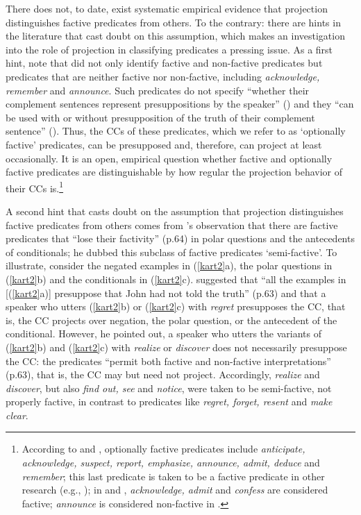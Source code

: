 \documentclass[11pt,fleqn]{article}
\newcommand{\6}{\mbox{$[\hspace*{-.6mm}[$}}
\newcommand{\9}{\mbox{$]\hspace*{-.6mm}]$}}
\newcommand{\citepos}[1]{\citeauthor{#1}'s \citeyear{#1}}
\begin{document}
There does not, to date, exist systematic empirical evidence that projection distinguishes factive predicates from others. To the contrary: there are hints in the literature that cast doubt on this assumption, which makes an investigation into the role of projection in classifying predicates a pressing issue. As a first hint, note that \citealt{kiparsky-kiparsky70} did not only identify factive and non-factive predicates but predicates that are neither factive nor non-factive, including {\em acknowledge, remember} and {\em announce}. Such predicates do not specify ``whether their complement sentences represent presuppositions by the speaker'' (\citealt[164]{kiparsky-kiparsky70}) and they ``can be used with or without presupposition of the truth of their complement sentence'' (\citealt[340]{karttunen71-implicative}). Thus, the CCs of these predicates, which we refer to as `optionally factive' predicates, can be presupposed and, therefore, can project at least occasionally. It is an open, empirical question whether factive and optionally factive predicates are distinguishable by how regular the projection behavior of their CCs is.\footnote{According to \citet{kiparsky-kiparsky70} and \citet{karttunen71-implicative}, optionally factive predicates include {\em anticipate, acknowledge, suspect, report, emphasize, announce, admit, deduce} and {\em remember}; this last predicate is taken to be a factive predicate in other research (e.g., \citealt{simons07,kastner2015,abrusan2016,karttunen2016,aravind-hackl2017,cremers2018}); in \citealt{karttunen-zaenen2005} and \citealt{karttunen2016}, {\em acknowledge, admit} and {\em confess} are considered factive; {\em announce} is considered non-factive in \citealt{karttunen-zaenen2005}.}

A second hint that casts doubt on the assumption that projection distinguishes factive predicates from others comes from \citepos{karttunen71b} observation that there are factive predicates that ``lose their factivity'' (p.64) in polar questions and the antecedents of conditionals; he dubbed this subclass of factive predicates `semi-factive'. To illustrate, consider the negated examples in (\ref{kart2}a), the polar questions in (\ref{kart2}b) and the conditionals in (\ref{kart2}c). \citet{karttunen71b} suggested that ``all the examples in [(\ref{kart2}a)] presuppose that John had not told the truth'' (p.63) and that a speaker who utters (\ref{kart2}b) or (\ref{kart2}c) with {\em regret} presupposes the CC, that is, the CC projects over negation, the polar question, or  the antecedent of the conditional. However, he pointed out, a speaker who utters the variants of (\ref{kart2}b) and (\ref{kart2}c) with {\em realize} or {\em discover} does not necessarily presuppose the CC: the predicates ``permit both factive and non-factive interpretations'' (p.63), that is, the CC may but need not project. Accordingly, {\em realize} and {\em discover}, but also {\em find out, see} and {\em notice}, were taken to be semi-factive, not properly factive, in contrast to predicates like {\em regret, forget, resent} and {\em make clear}.
\end{document}
